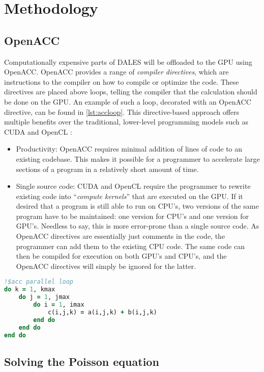 \section{Methodology}

\subsection{OpenACC}
Computationally expensive parts of DALES will be offloaded to the GPU using OpenACC. OpenACC provides a range of \emph{compiler directives}, which are instructions to the compiler on how to compile or optimize the code. These directives are placed above loops, telling the compiler that the calculation should be done on the GPU. An example of such a loop, decorated with an OpenACC directive, can be found in \autoref{lst:accloop}. This directive-based approach offers multiple benefits over the traditional, lower-level programming models such as CUDA and OpenCL \citep{Herdman2012}:

\begin{itemize}
    \item Productivity: OpenACC requires minimal addition of lines of code to an existing codebase. This makes it possible for a programmer to accelerate large sections of a program in a relatively short amount of time. 
    \item Single source code: CUDA and OpenCL require the programmer to rewrite existing code into ``\emph{compute kernels}'' that are executed on the GPU. If it desired that a program is still able to run on CPU's, two versions of the same program have to be maintained: one version for CPU's and one version for GPU's. Needless to say, this is more error-prone than a single source code. As OpenACC directives are essentially just comments in the code, the programmer can add them to the existing CPU code. The same code can then be compiled for execution on both GPU's and CPU's, and the OpenACC directives will simply be ignored for the latter.
\end{itemize}

\begin{lstlisting}[language=Fortran, caption={Example of a Fortran loop offloaded to the GPU.}, label={lst:accloop}]
!$acc parallel loop
do k = 1, kmax
    do j = 1, jmax
        do i = 1, imax
            c(i,j,k) = a(i,j,k) + b(i,j,k)
        end do
    end do
end do
\end{lstlisting}

\subsection{Solving the Poisson equation}

